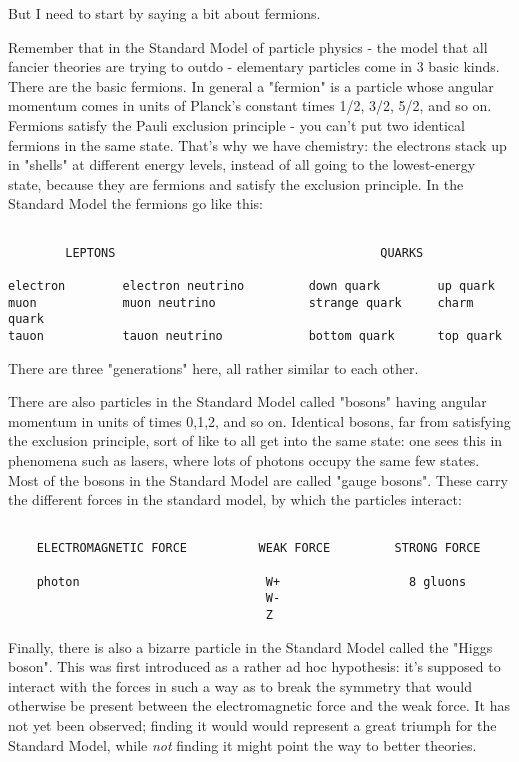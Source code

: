 But I need to start by saying a bit about fermions.  

Remember that in the Standard Model of particle physics - the model
that all fancier theories are trying to outdo - elementary particles
come in 3 basic kinds.  There are the basic fermions.  In general a
"fermion" is a particle whose angular momentum comes in units of
Planck's constant \hbar  times 1/2, 3/2, 5/2, and so on.  Fermions satisfy
the Pauli exclusion principle - you can't put two identical fermions
in the same state.  That's why we have chemistry: the electrons stack up
in "shells" at different energy levels, instead of all going to the
lowest-energy state, because they are fermions and satisfy the exclusion
principle.  In the Standard Model the fermions go like this:


\begin{verbatim}

        LEPTONS                                     QUARKS

electron        electron neutrino         down quark        up quark
muon            muon neutrino             strange quark     charm quark
tauon           tauon neutrino            bottom quark      top quark

\end{verbatim}
    
There are three "generations" here, all rather similar to each other.  

There are also particles in the Standard Model called "bosons" having
angular momentum in units of \hbar  times 0,1,2, and so on.  Identical
bosons, far from satisfying the exclusion principle, sort of like to all
get into the same state: one sees this in phenomena such as lasers,
where lots of photons occupy the same few states.  Most of the bosons
in the Standard Model are called "gauge bosons".  These carry the 
different forces in the standard model, by which the particles interact:


\begin{verbatim}

    ELECTROMAGNETIC FORCE          WEAK FORCE         STRONG FORCE
        
    photon                          W+                  8 gluons 
                                    W-
                                    Z  

\end{verbatim}
    
Finally, there is also a bizarre particle in the Standard Model called the 
"Higgs boson".  This was first introduced as a rather ad hoc hypothesis:
it's supposed to interact with the forces in such a way as to break the
symmetry that would otherwise be present between the electromagnetic
force and the weak force.  It has not yet been observed; finding it would
would represent a great triumph for the Standard Model, while \emph{not}
finding it might point the way to better theories.  

